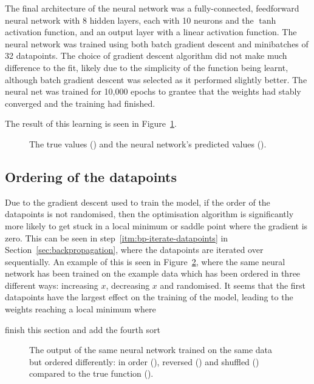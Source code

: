 The final architecture of the neural network was a fully-connected, feedforward neural network with 8 hidden layers, each with 10 neurons and the \(\tanh\) activation function, and an output layer with a linear activation function.
The neural network was trained using both batch gradient descent and minibatches of 32 datapoints.
The choice of gradient descent algorithm did not make much difference to the fit, likely due to the simplicity of the function being learnt, although batch gradient descent was selected as it performed slightly better.
The neural net was trained for 10,000 epochs to grantee that the weights had stably converged and the training had finished.

The result of this learning is seen in Figure~\ref{fig:ann-preds}.

\begin{figure}[htbp]
	\centering
	
	\caption{The true values (\truthcolour) and the neural network's predicted values (\anncolour).}
	\label{fig:ann-preds}
\end{figure}

\subsection{Ordering of the datapoints}

Due to the gradient descent used to train the model, if the order of the datapoints is not randomised, then the optimisation algorithm is significantly more likely to get stuck in a local minimum or saddle point where the gradient is zero.
This can be seen in step~\ref{itm:bp-iterate-datapoints} in Section~\ref{sec:backpropagation}, where the datapoints are iterated over sequentially.
An example of this is seen in Figure~\ref{fig:compare-order}, where the same neural network has been trained on the example data which has been ordered in three different ways: increasing \(x\), decreasing \(x\) and randomised.
It seems that the first datapoints have the largest effect on the training of the model, leading to the weights reaching a local minimum where 

\begin{todo}
	finish this section and add the fourth sort
\end{todo}

\begin{figure}[htbp]
	\centering
	
	\caption{The output of the same neural network trained on the same data but ordered differently: in order (\inordercolour), reversed (\reversedcolour) and shuffled (\shuffledcolour) compared to the true function (\truthcolour).}
	\label{fig:compare-order}
\end{figure}

